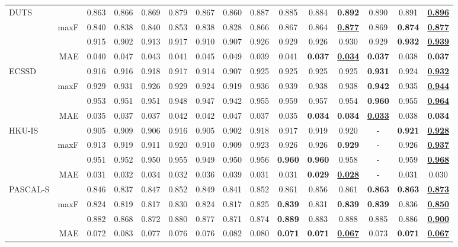 \documentclass[10pt,twocolumn,letterpaper]{article}
\def\blu#1{\textbf{\color{blue} #1}} \def\red#1{\textbf{\color{red}\underline{#1}}}
\begin{document}
\begin{table*}[t]
\begin{tabular}{lr|cccccccccccc|c}
  \multirow{4}{*}{DUTS}
&   &0.863 &0.866 &0.869 &0.879 &0.867 &0.860 &0.887 &0.885 &0.884 &\blu{0.892} &0.890 &0.891 &\red{0.896} \\
    & maxF &0.840 &0.838 &0.840 &0.853 &0.838 &0.828 &0.866 &0.867 &0.864 &\red{0.877} &0.869 &\blu{0.874} &\red{0.877}\\
    &  &0.915 &0.902 &0.913 &0.917 &0.910 &0.907 &0.926 &0.929 &0.926 &0.930 &0.929 &\blu{0.932} &\red{0.939}\\
  \cite{wang2017duts}& MAE &0.040 &0.047 &0.043 &0.041 &0.045 &0.049 &0.039 &0.041 &\blu{0.037} &\red{0.034} &\blu{0.037} &0.038 &\blu{0.037}\\
     \hline
\multirow{4}{*}{ECSSD}
    &    &0.916 &0.916 &0.918 &0.917 &0.914 &0.907 &0.925 &0.925 &0.925 &0.925 &\blu{0.931} &0.924 &\red{0.932}\\
    & maxF  &0.929 &0.931 &0.926 &0.929 &0.924 &0.919 &0.936 &0.939 &0.938 &0.938 &\blu{0.942} &0.935 &\red{0.944}\\
    &  &0.953 &0.951 &0.951 &0.948 &0.947 &0.942 &0.955 &0.959 &0.957 &0.954 &\blu{0.960} &0.955 &\red{0.964} \\
   \cite{yan2013ECSSD}& MAE &0.035 &0.037 &0.037 &0.042 &0.042 &0.047 &0.037 &0.035 &\blu{0.034} &\blu{0.034} &\red{0.033} &0.038 &\blu{0.034}\\
     \hline
\multirow{4}{*}{HKU-IS}
    &   &0.905 &0.909 &0.906 &0.916 &0.905 &0.902 &0.918 &0.917 &0.919 &0.920 &- &\blu{0.921} &\red{0.928} \\
    & maxF &0.913 &0.919 &0.911 &0.920 &0.910 &0.909 &0.923 &0.926 &0.926 &\blu{0.929} &- &0.926 &\red{0.937} \\
    &  &0.951 &0.952 &0.950 &0.955 &0.949 &0.950 &0.956 &\blu{0.960} &\blu{0.960} &0.958 &- &0.959 &\red{0.968}\\
     \cite{li2015HKUIS}& MAE &0.031 &0.032 &0.034 &0.032 &0.036 &0.039 &0.031 &0.031 &\blu{0.029} &\red{0.028} &- &0.031 &0.030\\
     \hline
\multirow{4}{*}{PASCAL-S}
    &    &0.846 &0.837 &0.847 &0.852 &0.849 &0.841 &0.852 &0.861 &0.856 &0.861 &\blu{0.863} &\blu{0.863} &\red{0.873}\\
    & maxF  &0.824 &0.819 &0.817 &0.830 &0.824 &0.817 &0.825 &\blu{0.839} &0.831 &\blu{0.839} &\blu{0.839} &0.836 &\red{0.850}\\
    &   &0.882 &0.868 &0.872 &0.880 &0.877 &0.871 &0.874 &\blu{0.889} &0.883 &0.888 &0.885 &0.886 &\red{0.900} \\
    \cite{li2014PASCALS}& MAE &0.072 &0.083 &0.077 &0.076 &0.076 &0.082 &0.080 &\blu{0.071} &\blu{0.071} &\red{0.067} &0.073 &\blu{0.071} &\red{0.067}\\
     \hline


\end{tabular}
\end{table*}
\end{document}
